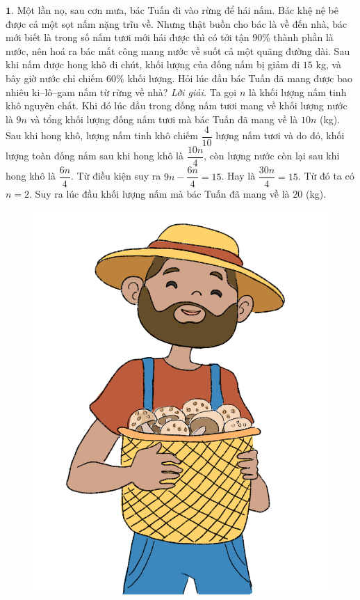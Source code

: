 \begin{multicols}{2}
	$\pmb{1.}$ Một lần nọ, sau cơn mưa, bác Tuấn đi vào rừng để hái nấm. Bác khệ nệ bê được cả một sọt nấm nặng trĩu về. Nhưng thật buồn cho bác là về đến nhà, bác mới biết là trong số nấm tươi mới hái được thì có tới tận $90\%$ thành phần là nước, nên hoá ra bác mất công mang nước về suốt cả một quãng đường dài. Sau khi nấm được hong khô đi chút, khối lượng của đống nấm bị giảm đi $15$ kg, và bây giờ nước chỉ chiếm $60\%$ khối lượng. Hỏi lúc đầu bác Tuấn đã mang được bao nhiêu ki--lô--gam nấm từ rừng về nhà?
	\vskip 0.1cm
	\textit{Lời giải.} 	Ta gọi $n$ là khối lượng nấm tinh khô nguyên chất. Khi đó lúc đầu trong đống nấm tươi mang về khối lượng nước là $9n$ và tổng khối lượng đống nấm tươi mà bác Tuấn đã mang về là $10n$ (kg). Sau khi hong khô, lượng nấm tinh khô chiếm $\dfrac{4}{10}$ lượng nấm tươi và do đó, khối lượng toàn đống nấm sau khi hong khô là $\dfrac{10n}{4}$, còn lượng nước còn lại sau khi hong khô là $\dfrac{6n}{4}$.
	\vskip 0.1cm
	Từ điều kiện suy ra $9n-\dfrac{6n}{4} =15$. Hay là $\dfrac{30n}{4}=15$. Từ đó ta có $n=2$. Suy ra lúc đầu khối lượng nấm mà bác Tuấn đã mang về là $20$ (kg).
	\begin{figure}[H]
		\centering
		\vspace*{-5pt}
		\captionsetup{labelformat= empty, justification=centering}
		\includegraphics[width=0.75\linewidth]{bai1}

\end{figure}
\end{multicols}
